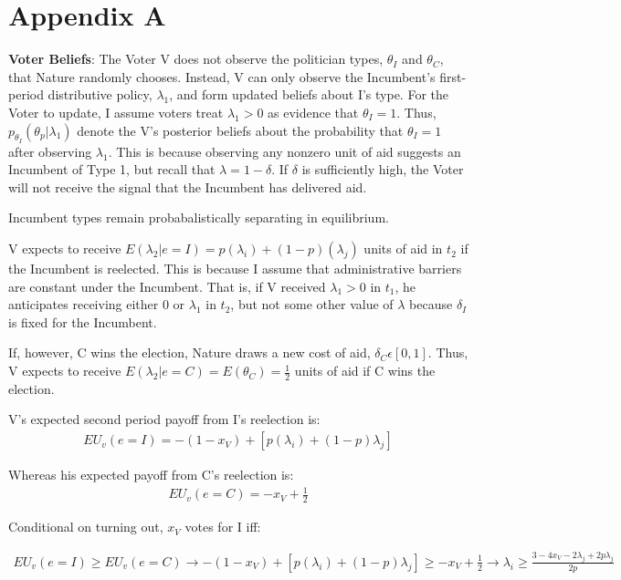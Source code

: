 \documentclass[12pt]{paper}
\begin{document}
\section*{Appendix A}
\textbf{Voter Beliefs}: The Voter V does not observe the politician types, $\theta_I$ and $\theta_C$, that Nature randomly chooses. Instead, V can only observe the Incumbent's first-period distributive policy,  $\lambda_1$, and form updated beliefs about I’s type.  For the Voter to update, I assume voters treat $\lambda_1 > 0$ as evidence that $\theta_I = 1$. Thus, $p_{\theta_I} (\theta_p | \lambda_1 )$ denote the V’s posterior beliefs about the probability that $\theta_I = 1$ after observing $\lambda_1$. This is because observing any nonzero unit of aid suggests an Incumbent of Type 1, but recall that $\lambda = 1 - \delta$. If $\delta$ is sufficiently high, the Voter will not receive the signal that the Incumbent has delivered aid.

Incumbent types remain probabalistically separating in equilibrium.

V expects to receive $E(\lambda_2 | e=I) = p(\lambda_i) + (1-p)(\lambda_j)$ units of aid in $t_2$ if the Incumbent is reelected. This is because I assume that administrative barriers are constant under the Incumbent. That is, if V received $\lambda_1 > 0$ in $t_1$, he anticipates receiving either $0$ or $\lambda_1$ in $t_2$, but not some other value of $\lambda$ because $\delta_I$ is fixed for the Incumbent.

If, however, C wins the election, Nature draws a new cost of aid, $\delta_C \epsilon [0,1]$. Thus, V expects to receive $E(\lambda_2 | e=C) = E(\theta_C) = \frac{1}{2}$ units of aid if C wins the election.

V’s expected second period payoff from I’s reelection is: 
\begin{gather}
EU_v(e = I) = -(1 - x_V) + [p(\lambda_i) + (1-p)\lambda_j] 
\end{gather}

Whereas his expected payoff from C's reelection is:
\begin{gather}
EU_v(e = C) = -x_V + \frac{1}{2}
\end{gather}

Conditional on turning out, $x_V$ votes for I iff:

\begin{gather}
EU_v(e = I) \geq EU_v(e = C) \rightarrow -(1 - x_V) + [p(\lambda_i) + (1-p)\lambda_j] \geq -x_V + \frac{1}{2} \rightarrow
\lambda_i \geq \frac{3 - 4x_V - 2\lambda_j + 2p\lambda_j}{2p}
\end{gather}
\end{document}
